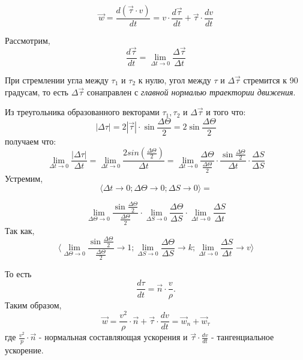 \documentclass[12pt,a4paper]{report}
\begin{document}
\begin{enumerate}
\begin{enumerate}
                    \[\vec w = \frac{d(\vec \tau \cdot v)}{dt} = v\cdot \frac{d \vec \tau}{dt} + \vec \tau\cdot \frac{dv}{dt}\]

                    Рассмотрим, \[ \frac{d \vec \tau}{dt} = \lim_{\Delta t \to 0}  \frac{\Delta \vec \tau}{\Delta t}\]

                    При стремлении угла между $\tau_1$ и $\tau_2$ к нулю, угол между $\tau$ и $\Delta \vec \tau$ стремится к 90 градусам, то есть $\Delta \vec \tau$ сонаправлен с \textit{главной нормалью траектории движения}.

                    Из треугольника образованного векторами $\tau_1, \tau_2$ и $\Delta \vec \tau$ и того что:
                    \[|\Delta \tau| = 2 |\vec \tau| \cdot \sin{\frac{\Delta \Theta}{2}} = 2\sin{\frac{\Delta \Theta}{2}}\]
                    получаем что: \[ \lim_{\Delta t \to 0}  \frac{|\Delta \tau|}{\Delta t} = \lim_{\Delta t \to 0}  \frac{2sin(\frac{\Delta \Theta}{2})}{\Delta t} =
                        \lim_{\Delta t \to 0}  \frac{\Delta \Theta}{\frac{\Delta \Theta}{2}}\cdot\frac{\sin{\frac{\Delta \Theta}{2}}}{\Delta t}\cdot\frac{\Delta S}{\Delta S} \]
                    Устремим,
                    \[ \langle \Delta t \to 0 ;\Delta \Theta \to 0; \Delta S \to 0 \rangle = \]

                    \[ \lim_{\Delta \Theta \to 0}  \frac{\sin{\frac{\Delta \Theta}{2}}}{\frac{\Delta \Theta}{2}} \cdot \lim_{\Delta S \to 0} \frac{\Delta \Theta}{\Delta S} \cdot \lim_{\Delta t \to 0} \frac{\Delta S}{\Delta t} \]
                    Так как,
                    \[ \langle \lim_{\Delta \Theta \to 0}  \frac{\sin{\frac{\Delta \Theta}{2}}}{\frac{\Delta \Theta}{2}} \to 1 ; \lim_{\Delta S \to 0} \frac{\Delta \Theta}{\Delta S} \to k; \lim_{\Delta t \to 0} \frac{\Delta S}{\Delta t} \to v \rangle \]

                    \vspace{5px}

                    То есть \[\frac{d \tau}{dt} = \vec n \cdot \frac{v}{\rho}. \]
                    Таким образом,\[ \vec w = \frac{v^2}{\rho} \cdot \vec n + \vec \tau \cdot \frac{dv}{dt} = \vec w_n + \vec w_\tau \]где $\frac{v^2}{p} \cdot \vec n$  - нормальная составляющая ускорения и $\vec \tau \cdot \frac{dv}{dt}$ - тангенциальное ускорение.


\end{enumerate}
\end{enumerate}
\end{document}
